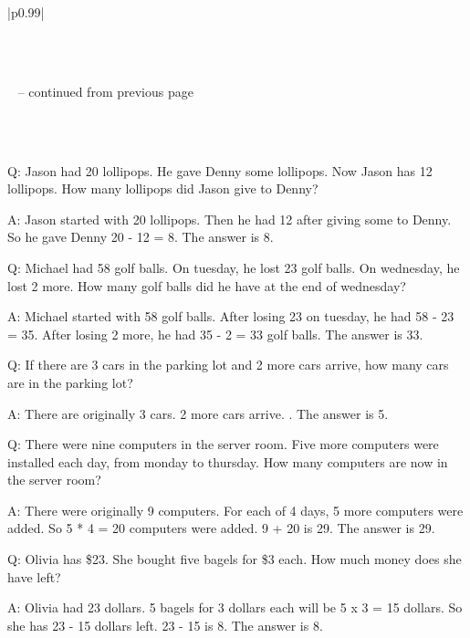 \begin{center}
\begin{longtable}{|p{}|}
\caption{Example-based \theirs error analysis on .}
\label{tab:example_multiarith_comparison_davinci001}\\

\toprule {} \\ \midrule 
\endfirsthead

%
{{\tablename\ \thetable{} -- continued from previous page}} \\
\toprule {} \\ \midrule
\endhead

 \\ \bottomrule
\endfoot

\bottomrule
\endlastfoot

 \par
Q: Jason had 20 lollipops. He gave Denny some lollipops. Now Jason has 12 lollipops. How many lollipops did Jason give to Denny? \par
A: Jason started with 20 lollipops. Then he had 12 after giving some to Denny. So he gave Denny 20 - 12 = 8. The answer is 8.

Q: Michael had 58 golf balls. On tuesday, he lost 23 golf balls. On wednesday, he lost 2 more. How many golf balls did he have at the end of wednesday? \par
A: Michael started with 58 golf balls. After losing 23 on tuesday, he had 58 - 23 = 35. After losing 2 more, he had 35 - 2 = 33 golf balls. The answer is 33.

Q: If there are 3 cars in the parking lot and 2 more cars arrive, how many cars are in the parking lot? \par
A: There are originally 3 cars. 2 more cars arrive. . The answer is 5.

Q: There were nine computers in the server room. Five more computers were installed each day, from monday to thursday. How many computers are now in the server room? \par
A: There were originally 9 computers. For each of 4 days, 5 more computers were added. So 5 * 4 = 20 computers were added. 9 + 20 is 29. The answer is 29.

Q: Olivia has \$23. She bought five bagels for \$3 each. How much money does she have left? \par
A: Olivia had 23 dollars. 5 bagels for 3 dollars each will be 5 x 3 = 15 dollars. So she has 23 - 15 dollars left. 23 - 15 is 8. The answer is 8.


\end{longtable}
\end{center}
